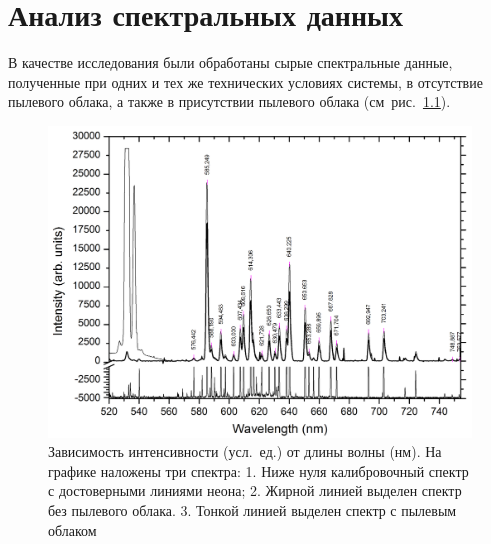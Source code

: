 \chapter{Анализ спектральных данных}
\label{cha:ch_5}

В качестве исследования были обработаны сырые спектральные данные, полученные при одних и тех же
технических условиях системы, в отсутствие пылевого облака, а также в присутствии пылевого облака (см~рис.~\ref{fig:fig34}).

\begin{figure}
    \centering
    \includegraphics[width=15cm]{figures/fig34}
    \caption{
        Зависимость интенсивности (усл.~ед.) от длины волны (нм). На графике наложены три спектра:
        1. Ниже нуля калибровочный спектр с достоверными линиями неона;
        2. Жирной линией выделен спектр без пылевого облака.
        3. Тонкой линией выделен спектр с пылевым облаком
    }
    \label{fig:fig34}
\end{figure}



